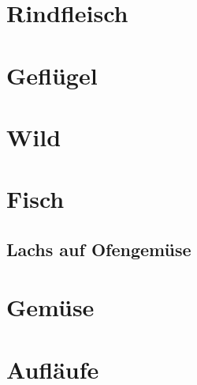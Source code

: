 \documentclass[ngerman,11pt,parskip=half,a5paper,twoside]{scrbook}
\begin{document}
\chapter{Rindfleisch}

\clearpage

\chapter{Geflügel}

\clearpage

\chapter{Wild}

\clearpage

\chapter{Fisch}

\clearpage

	\section{Lachs auf Ofengemüse}
	
	\clearpage

\chapter{Gemüse}

\clearpage

\chapter{Aufläufe}
\end{document}
